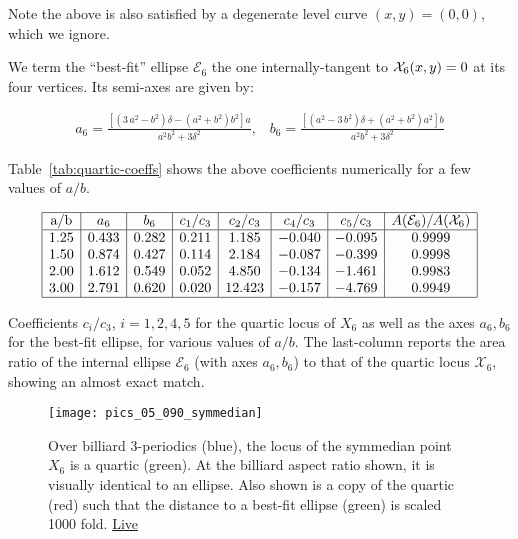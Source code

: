  \noindent Note the above is also satisfied by a degenerate level curve $(x,y)=(0,0)$, which we ignore.

\begin{remark}
We term the ``best-fit'' ellipse $\mathcal{E}_6$ the one internally-tangent to $\mathcal{X}_6(x,y)=0$ at its four vertices. Its semi-axes are given by: 

{\small  
\begin{align*}
a_6= \frac{\left[(3\,a^2-b^2)\delta -(a^2+b^2)b^2\right]a}{a^2b^2+3\delta^2},\;\;\;
b_6= \frac{\left[(a^2-3\,b^2)\delta + (a^2+b^2)a^2\right]b}{a^2b^2+3\delta^2}
\label{eqn:x6-ellipse}
\end{align*}
}
\end{remark}

Table~\ref{tab:quartic-coeffs} shows the above coefficients numerically for a few values of $a/b$.

\begin{table}
    \centering
$$
\begin{array}{|c|c|c|c|c|c|c|c|}
\hline
 \text{a/b} & a_6 & b_6 & c_1/c_3 & c_2/c_3 & c_4/c_3 & c_5/c_3 & A(\mathcal{E}_6)/A(\mathcal{X}_6) \\
 \hline
  1.25 & 0.433 & 0.282 & 0.211 & 1.185 & -0.040 & -0.095 & 0.9999 \\
 1.50 & 0.874 & 0.427 & 0.114 & 2.184 & -0.087 & -0.399 & 0.9998 \\
 2.00 & 1.612 & 0.549 & 0.052 & 4.850 & -0.134 & -1.461 & 0.9983 \\
 3.00 & 2.791 & 0.620 & 0.020 & 12.423 & -0.157 & -4.769 & 0.9949 \\
 \hline
\end{array}
$$
\caption{Coefficients $c_i/c_3$, $i=1,2,4,5$ for the quartic locus of $X_6$ as well as the axes $a_6,b_6$ for the best-fit ellipse, for various values of $a/b$. The last-column reports the area ratio of the internal ellipse $\mathcal{E}_6$ (with axes $a_6,b_6$) to that of the quartic locus $\mathcal{X}_6$, showing an almost exact match.}
\label{tab:quartic-coeffs}
\end{table}


\begin{figure}
    \centering
    \texttt{[image: pics\_05\_090\_symmedian]}
    \caption{Over billiard 3-periodics (blue), the locus of the symmedian point $X_6$ is a quartic (green). At the billiard aspect ratio shown, it is visually identical to an ellipse. Also shown is a copy of the quartic (red) such that the distance to a best-fit ellipse (green) is scaled 1000 fold. \href{https://bit.ly/3hxOZoV}{Live}}
    \label{fig:05-locus-x6}
\end{figure}

